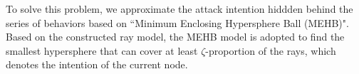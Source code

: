 \documentclass[lettersize,journal]{IEEEtran}
\begin{document}











To solve this problem, we approximate the attack intention hiddden behind the series of behaviors based on ``Minimum Enclosing Hypersphere Ball (MEHB)". Based on the constructed ray model, the MEHB model is adopted to find the smallest hypersphere that can cover at least \( \zeta \)-proportion of the rays, which denotes the intention of the current node.
\end{document}
